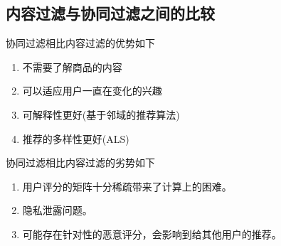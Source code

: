 \subsection{内容过滤与协同过滤之间的比较}
协同过滤相比内容过滤的优势如下
\begin{enumerate}
    \item 不需要了解商品的内容
    \item 可以适应用户一直在变化的兴趣
    \item 可解释性更好(基于邻域的推荐算法)
    \item 推荐的多样性更好(ALS)
\end{enumerate}
协同过滤相比内容过滤的劣势如下
\begin{enumerate}
    \item 用户评分的矩阵十分稀疏带来了计算上的困难。
    \item 隐私泄露问题。
    \item 可能存在针对性的恶意评分，会影响到给其他用户的推荐。
\end{enumerate}
